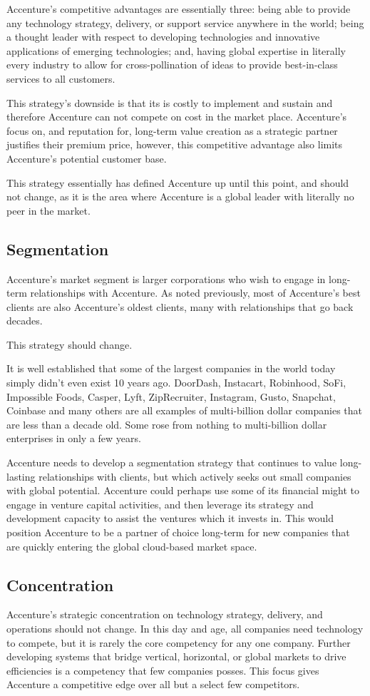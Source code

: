 Accenture's competitive advantages are essentially three: being able to provide any technology strategy, delivery, or support service anywhere in the world; being a thought leader with respect to developing technologies and innovative applications of emerging technologies; and, having global expertise in literally every industry to allow for cross-pollination of ideas to provide best-in-class services to all customers.

This strategy's downside is that its is costly to implement and sustain and therefore Accenture can not compete on cost in the market place. Accenture's focus on, and reputation for, long-term value creation as a strategic partner justifies their premium price, however, this competitive advantage also limits Accenture's potential customer base.

This strategy essentially has defined Accenture up until this point, and should not change, as it is the area where Accenture is a global leader with literally no peer in the market.

\subsection{Segmentation}

Accenture's market segment is larger corporations who wish to engage in long-term relationships with Accenture. As noted previously, most of Accenture's best clients are also Accenture's oldest clients, many with relationships that go back decades.

This strategy should change.

It is well established that some of the largest companies in the world today simply didn't even exist 10 years ago. DoorDash, Instacart, Robinhood, SoFi, Impossible Foods, Casper, Lyft, ZipRecruiter, Instagram, Gusto, Snapchat, Coinbase and many others are all examples of multi-billion dollar companies that are less than a decade old. Some rose from nothing to multi-billion dollar enterprises in only a few years.

Accenture needs to develop a segmentation strategy that continues to value long-lasting relationships with clients, but which actively seeks out small companies with global potential.  Accenture could perhaps use some of its financial might to engage in venture capital activities, and then leverage its strategy and development capacity to assist the ventures which it invests in. This would position Accenture to be a partner of choice long-term for new companies that are quickly entering the global cloud-based market space.

\subsection{Concentration}

Accenture's strategic concentration on technology strategy, delivery, and operations should not change. In this day and age, all companies need technology to compete, but it is rarely the core competency for any one company. Further developing systems that bridge vertical, horizontal, or global markets to drive efficiencies is a competency that few companies posses. This focus gives Accenture a competitive edge over all but a select few competitors.

